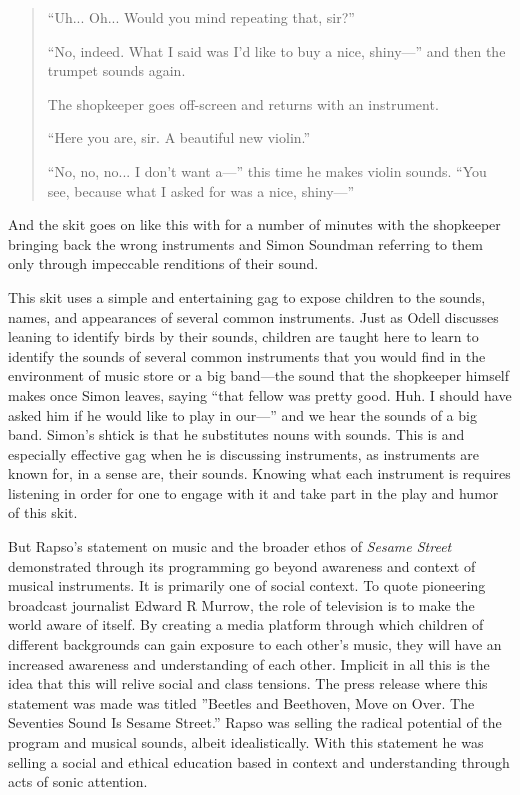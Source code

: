\documentclass[12pt,letterpaper]{article}
\newcommand{\ses}{\textit{Sesame Street }}
\begin{document}
	\begin{quote}
	\ttfamily
	``Uh... Oh... Would you mind repeating that, sir?''

	``No, indeed. What I said was I'd like to buy a nice, shiny---'' and
	then the trumpet sounds again. 

	The shopkeeper goes off-screen and returns with an instrument. 
	 
	``Here you are, sir. A beautiful new violin.''

	``No, no, no... I don't want a---'' this time he makes violin
	sounds.  ``You see, because what I asked for was a nice, shiny---''
	
	\end{quote}
	
	And the skit goes on like this with for a number of minutes with the 
	shopkeeper bringing back the wrong instruments and Simon Soundman
	referring to them only through impeccable renditions of their sound. 
	
	This skit uses a simple and entertaining gag to expose children to the
	sounds, names, and appearances of several common instruments. Just as 
	Odell
	discusses leaning to identify birds by their sounds, children are	
	taught here to learn to identify the sounds of several common 
	instruments that you would find in the environment of music store or 
	a big band---the sound that the shopkeeper himself makes once Simon
	leaves, saying ``that fellow was pretty good. Huh. I should have asked
	him if he would like to play in our---'' and we hear the sounds of a
	big band. Simon's shtick is that he substitutes nouns with sounds. This
	is and especially effective gag when he is discussing instruments, as
	instruments are known for, in a sense are, their sounds. Knowing what 
	each instrument is requires listening in order for one to engage with 
	it and take part in the play and humor of this skit.  

	But Rapso's statement on music and the broader ethos of \ses 
	demonstrated through its programming go beyond awareness and context of 
	musical instruments. It is primarily one of social context. To quote 
	pioneering broadcast journalist Edward R Murrow,
	the role of television is to make the world aware of
	itself.\autocite[49]{Davis} By creating a media platform through which 
	children of different backgrounds can gain exposure to each other's 
	music, they
	will have an increased awareness and understanding of each other.
	Implicit in all this is the idea that this will relive social and class
	tensions. The press release where this statement was made was titled 
	''Beetles and Beethoven, Move on Over. The Seventies Sound Is Sesame 
	Street.'' Rapso was selling the radical potential of the program and
	musical sounds, albeit idealistically. With this statement he was 
	selling a social and ethical education based in context and 
	understanding through acts of sonic attention. 
\end{document}
